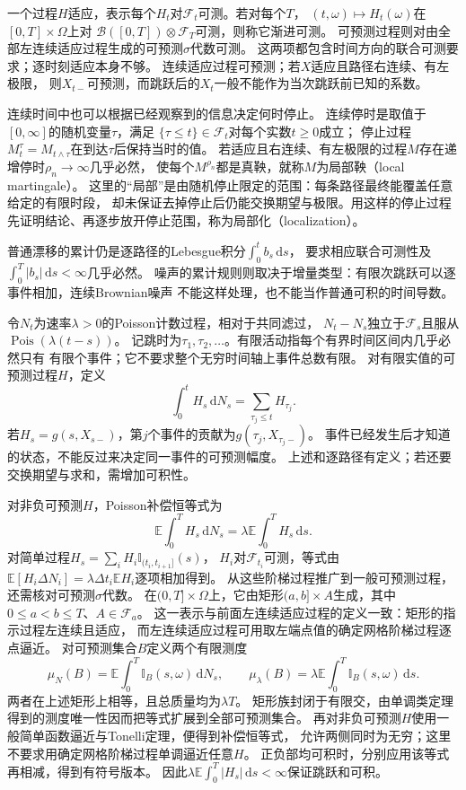 一个过程$H$适应，表示每个$H_t$对$\mathcal F_t$可测。若对每个$T$，
$(t,\omega)\mapsto H_t(\omega)$在$[0,T]\times\Omega$上对
$\mathcal B([0,T])\otimes\mathcal F_T$可测，则称它渐进可测。
可预测过程则对由全部左连续适应过程生成的可预测$\sigma$代数可测。
这两项都包含时间方向的联合可测要求；逐时刻适应本身不够。
连续适应过程可预测；若$X$适应且路径右连续、有左极限，
则$X_{t-}$可预测，而跳跃后的$X_t$一般不能作为当次跳跃前已知的系数。

连续时间中也可以根据已经观察到的信息决定何时停止。
连续停时是取值于$[0,\infty]$的随机变量$\tau$，满足
$\{\tau\leq t\}\in\mathcal F_t$对每个实数$t\geq0$成立；
停止过程$M^\tau_t=M_{t\wedge\tau}$在到达$\tau$后保持当时的值。
若适应且右连续、有左极限的过程$M$存在递增停时$\rho_n\to\infty$几乎必然，
使每个$M^{\rho_n}$都是真鞅，就称$M$为局部鞅（local martingale）。
这里的“局部”是由随机停止限定的范围：每条路径最终能覆盖任意给定的有限时段，
却未保证去掉停止后仍能交换期望与极限。用这样的停止过程先证明结论、再逐步放开停止范围，称为局部化（localization）。

普通漂移的累计仍是逐路径的Lebesgue积分$\int_0^t b_s\,\mathrm ds$，
要求相应联合可测性及$\int_0^T|b_s|\,\mathrm ds<\infty$几乎必然。
噪声的累计规则则取决于增量类型：有限次跳跃可以逐事件相加，连续Brownian噪声
不能这样处理，也不能当作普通可积的时间导数。

令$N_t$为速率$\lambda>0$的Poisson计数过程，相对于共同滤过，
$N_t-N_s$独立于$\mathcal F_s$且服从$\operatorname{Pois}(\lambda(t-s))$。
记跳时为$\tau_1,\tau_2,\ldots$。有限活动指每个有界时间区间内几乎必然只有
有限个事件；它不要求整个无穷时间轴上事件总数有限。
对有限实值的可预测过程$H$，定义
\begin{equation}
  \int_0^t H_s\,\mathrm dN_s
    =\sum_{\tau_j\leq t}H_{\tau_j}.
  \label{eq:action-state-poisson-integral}
\end{equation}
若$H_s=g(s,X_{s-})$，第$j$个事件的贡献为$g(\tau_j,X_{\tau_j-})$。
事件已经发生后才知道的状态，不能反过来决定同一事件的可预测幅度。
上述和逐路径有定义；若还要交换期望与求和，需增加可积性。

对非负可预测$H$，Poisson补偿恒等式为
\[
  \mathbb E\int_0^T H_s\,\mathrm dN_s
       =\lambda\mathbb E\int_0^T H_s\,\mathrm ds.
\]
对简单过程$H_s=\sum_iH_i\mathbb I_{(t_i,t_{i+1}]}(s)$，
$H_i$对$\mathcal F_{t_i}$可测，等式由
$\mathbb E[H_i\Delta N_i]=\lambda\Delta t_i\mathbb E H_i$逐项相加得到。
从这些阶梯过程推广到一般可预测过程，还需核对可预测$\sigma$代数。
在$(0,T]\times\Omega$上，它由矩形$(a,b]\times A$生成，其中
$0\leq a<b\leq T$、$A\in\mathcal F_a$。
这一表示与前面左连续适应过程的定义一致：矩形的指示过程左连续且适应，
而左连续适应过程可用取左端点值的确定网格阶梯过程逐点逼近。
对可预测集合$B$定义两个有限测度
\[
 \mu_N(B)=\mathbb E\int_0^T\mathbb I_B(s,\omega)\,\mathrm dN_s,
 \qquad
 \mu_\lambda(B)=\lambda\mathbb E\int_0^T\mathbb I_B(s,\omega)\,\mathrm ds.
\]
两者在上述矩形上相等，且总质量均为$\lambda T$。
矩形族封闭于有限交，由单调类定理得到的测度唯一性因而把等式扩展到全部可预测集合。
再对非负可预测$H$使用一般简单函数逼近与Tonelli定理，便得到补偿恒等式，
允许两侧同时为无穷；这里不要求用确定网格阶梯过程单调逼近任意$H$。
正负部均可积时，分别应用该等式再相减，得到有符号版本。
因此$\lambda\mathbb E\int_0^T|H_s|\,\mathrm ds<\infty$保证跳跃和可积。

